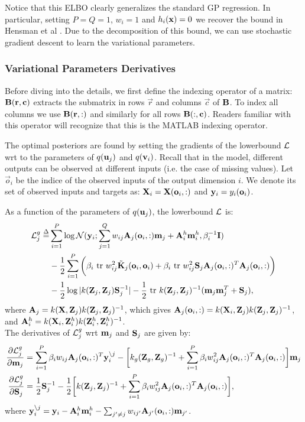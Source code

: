 \noindent Notice that this ELBO clearly generalizes the standard GP regression. In particular, setting $P = Q = 1$, $w_i = 1$ and $h_i(\x) = 0$ we recover the bound in Hensman et al \cite{hensmangaussian}.
Due to the decomposition of this bound, we can use stochastic gradient descent to learn the variational parameters.

\subsubsection{Variational Parameters Derivatives}
\newcommand{\oi}{\vec{o}_i}
Before diving into the details, we first define the indexing operator of a matrix: $\B(\vec{r},\vec{c})$ extracts the submatrix in rows $\vec{r}$ and columns $\vec{c}$ of $\B$.
To index all columns we use $\B(\vec{r},:)$ and similarly for all rows $\B(:,\vec{c})$.
Readers familiar with this operator will recognize that this is the MATLAB indexing operator.

The optimal posteriors are found by setting the gradients of the lowerbound $\calL$ wrt to the parameters of $q(\u_j)$ and $q(\v_i)$.
Recall that in the model, different outputs can be observed at different inputs (i.e. the case of missing values).
Let $\oi$ be the indice of the observed inputs of the output dimension $i$.
We denote its set of observed inputs and targets as: $\X_i = \X(\oi,:)$ and $\y_i = y_{i}(\oi)$.

\noindent As a function of the parameters of $q(\u_j)$, the lowerbound $\calL$ is:
\newcommand{\Ahi}{\A^h_i}
\begin{align}
\nonumber
\calL^g_j \define&
 \sum_{i=1}^P \log \Normal(\y_i; \sum_{j=1}^Q w_{ij} \A_j(\oi,:) \m_j + \Ahi \mhi, \beta_i^{-1} \I)  \\
 \nonumber
 &- \frac{1}{2} \sum_{i=1}^P \bigg(\beta_i \trace w_{ij}^2 \tilde{\K}_j(\oi,\oi) 
 + \beta_i \trace w_{ij}^2 \S_j \A_j(\oi,:)^T \A_j(\oi,:) \bigg)
 \\
 &- \frac{1}{2} \log |k(\Zj,\Zj) \S_j^{-1}| -\frac{1}{2} \trace k(\Zj,\Zj)^{-1} (\m_j \m_j^T + \S_j) ,
\end{align}
where $\A_j = k(\X,\Zj)k(\Zj,\Zj)^{-1}$, which gives $\A_j(\oi,:) = k(\X_i,\Zj) k(\Zj,\Zj)^{-1}$, and  
$\Ahi = k(\X_i,\Zhi)k(\Zhi,\Zhi)^{-1}$. \\

\newcommand{\Lgj}{\calL^g_j}
\newcommand{\ynoj}{\y_i^{\backslash j}}
\noindent The derivatives of $\Lgj$ wrt $\m_j$ and $\S_j$ are given by:
\begin{align}
\deriv{\Lgj}{\m_j}
& = \sum_{i=1}^P \beta_i w_{ij} \A_j(\oi,:)^T \ynoj - \bigg[k_g(\Zg,\Zg)^{-1} + \sum_{i=1}^P \beta_i w_{ij}^2 \A_j(\oi,:)^T \A_j(\oi,:) \bigg] \m_j \\
\deriv{\Lgj}{\S_j} 
&= \frac{1}{2} \S_j^{-1} - \frac{1}{2} \bigg[ k(\Zj,\Zj)^{-1} + \sum_{i=1}^P \beta_i w_{ij}^2 \A_j(\oi,:)^T \A_j(\oi,:) \bigg],
\end{align}
where $\y_i^{\backslash j} = \y_i - \Ahi \mhi - \sum_{j' \neq j} w_{ij'} \A_{j'}(\oi,:) \m_{j'}$.

